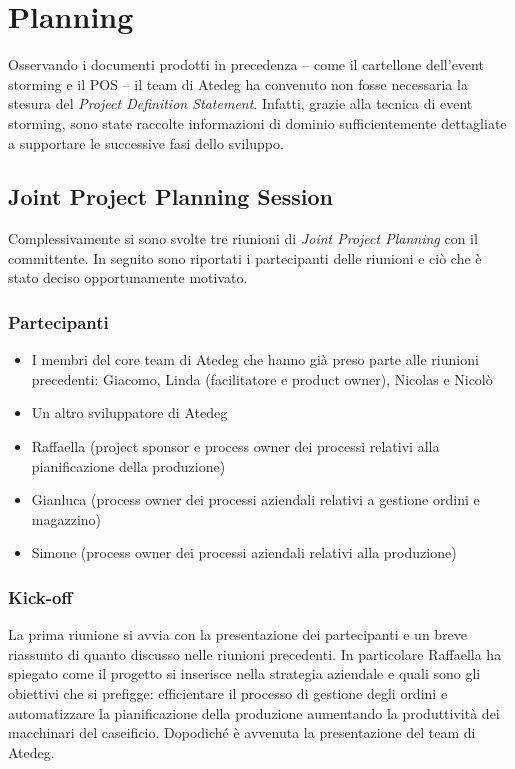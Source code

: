 \chapter{Planning}\label{ch:planning}
Osservando i documenti prodotti in precedenza -- come il cartellone dell'event storming e il POS -- il team di Atedeg ha convenuto non fosse necessaria la stesura del \emph{Project Definition Statement}.
Infatti, grazie alla tecnica di event storming, sono state raccolte informazioni di dominio sufficientemente dettagliate a supportare le successive fasi dello sviluppo.

\section{Joint Project Planning Session}\label{sec:JPPS}
Complessivamente si sono svolte tre riunioni di \emph{Joint Project Planning} con il committente. In seguito sono riportati i partecipanti delle riunioni e ciò che è stato deciso opportunamente motivato.

\subsection{Partecipanti}
\begin{itemize}
  \item I membri del core team di Atedeg che hanno già preso parte alle riunioni precedenti: Giacomo, Linda (facilitatore e product owner), Nicolas e Nicolò
  \item Un altro sviluppatore di Atedeg
  \item Raffaella (project sponsor e process owner dei processi relativi alla pianificazione della produzione)
  \item Gianluca (process owner dei processi aziendali relativi a gestione ordini e magazzino)
  \item Simone (process owner dei processi aziendali relativi alla produzione)
\end{itemize}

\subsection{Kick-off}
La prima riunione si avvia con la presentazione dei partecipanti e un breve riassunto di quanto discusso nelle riunioni precedenti. In particolare Raffaella ha spiegato come il progetto si inserisce nella strategia aziendale e quali sono gli obiettivi che si prefigge: efficientare il processo di gestione degli ordini e automatizzare la pianificazione della produzione aumentando la produttività dei macchinari del caseificio.
Dopodiché è avvenuta la presentazione del team di Atedeg.

